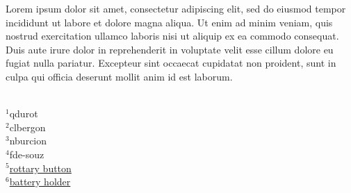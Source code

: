 \documentclass[letterpaper]{article}
\begin{document}
Lorem ipsum dolor sit amet, consectetur adipiscing elit, sed do eiusmod tempor incididunt ut labore et dolore magna aliqua. Ut enim ad minim veniam, quis nostrud exercitation ullamco laboris nisi ut aliquip ex ea commodo consequat. Duis aute irure dolor in reprehenderit in voluptate velit esse cillum dolore eu fugiat nulla pariatur. Excepteur sint occaecat cupidatat non proident, sunt in culpa qui officia deserunt mollit anim id est laborum. 

\footnotesize



{
\mbox{}\\
$^1$qdurot \\
$^2$clbergon\\
$^3$nburcion \\
$^4$fde-souz\\
$^5$\href{http://fr.farnell.com/bourns/pel12d-2226f-s3024/rotary-encoder-incremental-24/dp/1857558?st=rotary\%20encoder}{rottary button}\\
$^6$\href{http://fr.farnell.com/keystone/2480cn/battery-holder-aaa-size-wire-lead/dp/2784201?st=battery\%20holder}{battery holder}
}
\end{document}

